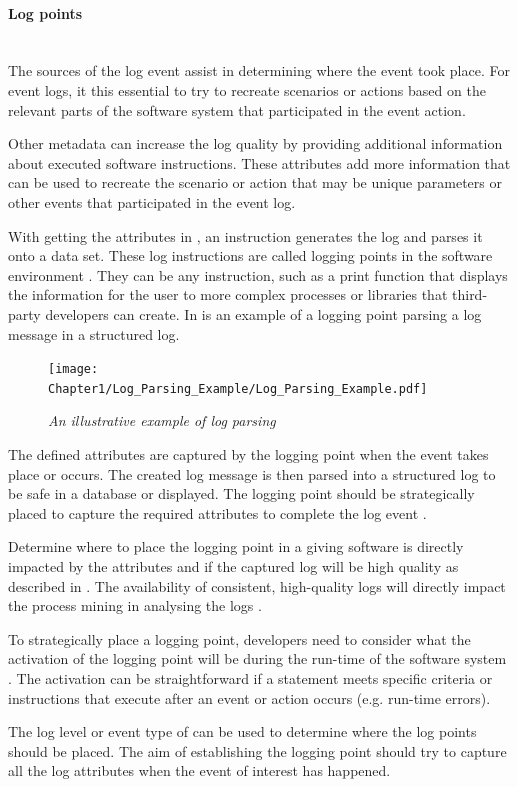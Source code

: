 \paragraph{Log points}\leavevmode\\
The sources of the log event assist in determining where the event took place. For event logs, it this essential to try to recreate scenarios or actions based on the relevant parts of the software system that participated in the event action.\par Other metadata can increase the log quality by providing additional information about executed software instructions. These attributes add more information that can be used to recreate the scenario or action that may be unique parameters or other events that participated in the event log.\par With getting the attributes in , an instruction generates the log and parses it onto a data set. These log instructions are called logging points in the software environment \cite{Pecchia2015, Zhu2015}. They can be any instruction, such as a print function that displays the information for the user to more complex processes or libraries that third-party developers can create. In  is an example of a logging point parsing a log message in a structured log. 

\begin{figure}[!htb]
	\centering %
	\texttt{[image: Chapter1/Log\_Parsing\_Example/Log\_Parsing\_Example.pdf]}
	\caption[An illustrative example of log parsing]
	{\textit{An illustrative example of log parsing \cite{Zhu2019}}} \label{fig:ch1_logParsing}
\end{figure}

The defined attributes are captured by the logging point when the event takes place or occurs. The created log message is then parsed into a structured log to be safe in a database or displayed. The logging point should be strategically placed to capture the required attributes to complete the log event \cite{Fedaghi2010}.\par Determine where to place the logging point in a giving software is directly impacted by the attributes and if the captured log will be high quality as described in . The availability of consistent, high-quality logs will directly impact the process mining in analysing the logs \cite{Kherbouche2017}.\par To strategically place a logging point, developers need to consider what the activation of the logging point will be during the run-time of the software system \cite{Pecchia2015, Cinque2013}. The activation can be straightforward if a statement meets specific criteria or instructions that execute after an event or action occurs (e.g. run-time errors). \par The log level or event type of  can be used to determine where the log points should be placed. The aim of establishing the logging point should try to capture all the log attributes when the event of interest has happened.

